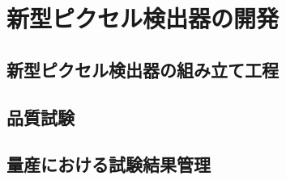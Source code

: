 \chapter{新型ピクセル検出器の開発}

\section{新型ピクセル検出器の組み立て工程}

\section{品質試験}

\section{量産における試験結果管理}


\newpage
